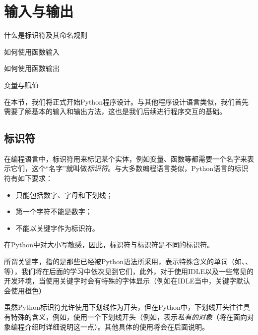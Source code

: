 \section{输入与输出}\label{sec:输入与输出}

\begin{Abstract}
    \item 什么是标识符及其命名规则
    \item 如何使用函数输入
    \item 如何使用函数输出
    \item 变量与赋值
\end{Abstract}

在本节，我们将正式开始Python程序设计。与其他程序设计语言类似，我们首先需要了解基本的输入和输出方法，这也是我们后续进行程序交互的基础。

\subsection{标识符}\label{subsec:输入与输出-标识符}

在编程语言中，标识符用来标记某个实体，例如变量、函数等都需要一个名字来表示它们，这个“名字”就叫做\emph{标识符}。与大多数编程语言类似，Python语言的标识符有如下要求：

\begin{itemize}
    \item 只能包括数字、字母和下划线；
    \item 第一个字符不能是数字；
    \item 不能以关键字作为标识符。
\end{itemize}

\begin{attention}
    在Python中对大小写敏感，因此，标识符与标识符是不同的标识符。

    所谓关键字，指的是那些已经被Python语法所采用，表示特殊含义的单词（如、、等），我们将在后面的学习中依次见到它们，此外，对于使用IDLE以及一些常见的开发环境，当使用关键字时会有特殊的字体显示（例如在IDLE当中，关键字默认会使用橙色）

    虽然Python标识符允许使用下划线作为开头，但在Python中，下划线开头往往具有特殊的含义，例如，使用一个下划线开头（例如，表示\emph{私有的对象}（将在面向对象编程介绍时详细说明这一点）。其他具体的使用将会在后面说明。
\end{attention}

